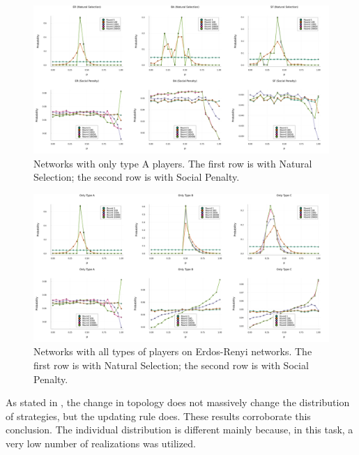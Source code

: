 \begin{figure}[H]
    \centering
    \includegraphics[width=1\textwidth]{images/Task34/TypeA_AllGraphs_AllRules.png}
    \caption{Networks with only type A players. The first row is with Natural Selection; the second row is with Social Penalty.}
\end{figure}

\begin{figure}[H]
    \centering
    \includegraphics[width=1\textwidth]{images/Task34/AllTypes_Erdos_AllRules.png}
    \caption{Networks with all types of players on Erdos-Renyi networks. The first row is with Natural Selection; the second row is with Social Penalty.}
\end{figure}

As stated in \cite{UltimatumGame}, the change in topology does not massively change the distribution of strategies, but the updating rule does.
These results corroborate this conclusion. The individual distribution is different mainly because, in this task, a very low number of realizations was utilized.
\newpage